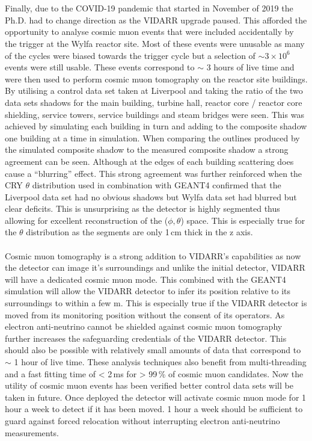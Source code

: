 \\\\Finally, due to the COVID-19 pandemic that started in November of 2019 the Ph.D. had to change direction as the VIDARR upgrade paused. This afforded the opportunity to analyse cosmic muon events that were included accidentally by the trigger at the Wylfa reactor site. Most of these events were unusable as many of the cycles were biased towards the trigger cycle but a selection of $\sim 3\times 10^6$ events were still usable. These events correspond to $\sim$ 3 hours of live time and were then used to perform cosmic muon tomography on the reactor site buildings. By utilising a control data set taken at Liverpool and taking the ratio of the two data sets shadows for the main building, turbine hall, reactor core / reactor core shielding, service towers, service buildings and steam bridges were seen. This was achieved by simulating each building in turn and adding to the composite shadow one building at a time in simulation. When comparing the outlines produced by the simulated composite shadow to the measured composite shadow a strong agreement can be seen. Although at the edges of each building scattering does cause a ``blurring'' effect. This strong agreement was further reinforced when the CRY \cite{ieee_cry_2007} $\theta$ distribution used in combination with GEANT4 confirmed that the Liverpool data set had no obvious shadows but Wylfa data set had blurred but clear deficits. This is unsurprising as the detector is highly segmented thus allowing for excellent reconstruction of the ($\phi,\theta$) space. This is especially true for the $\theta$ distribution as the segments are only 1\,cm thick in the z axis.
\\\\Cosmic muon tomography is a strong addition to VIDARR's capabilities as now the detector can image it's surroundings and unlike the initial detector, VIDARR will have a dedicated cosmic muon mode. This combined with the GEANT4 simulation will allow the VIDARR detector to infer its position relative to its surroundings to within a few m. This is especially true if the VIDARR detector is moved from its monitoring position without the consent of its operators. As electron anti-neutrino cannot be shielded against cosmic muon tomography further increases the safeguarding credentials of the VIDARR detector. This should also be possible with relatively small amounts of data that correspond to $\sim$ 1 hour of live time. These analysis techniques also benefit from multi-threading and a fast fitting time of < 2\,ms for > 99\,\% of cosmic muon candidates. Now the utility of cosmic muon events has been verified better control data sets will be taken in future. Once deployed the detector will activate cosmic muon mode for 1 hour a week to detect if it has been moved. 1 hour a week should be sufficient to guard against forced relocation without interrupting electron anti-neutrino measurements.
